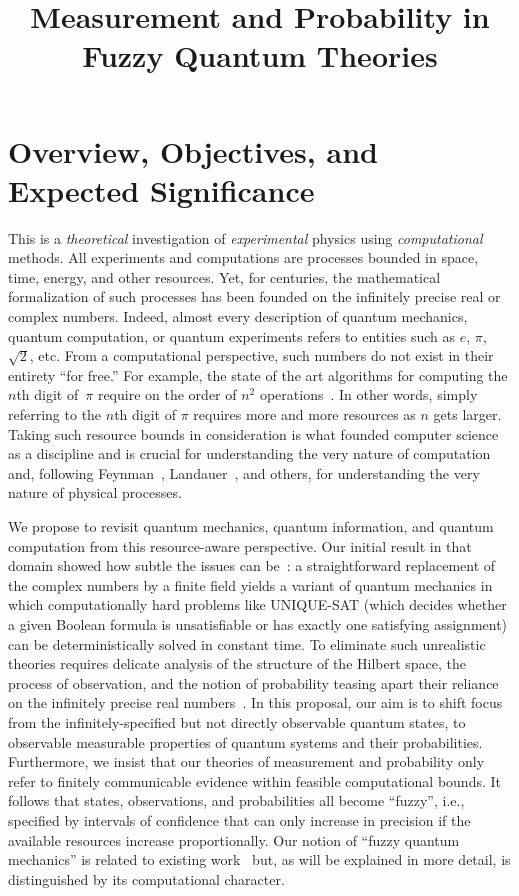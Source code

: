 \documentclass{article}
\title{Measurement and Probability in Fuzzy Quantum Theories}
\date{}
\theoremstyle{remark}
\begin{document}
\maketitle 

\section{Overview, Objectives, and Expected Significance} 

This is a \emph{theoretical} investigation of \emph{experimental}
physics using \emph{computational} methods. All experiments and
computations are processes bounded in space, time, energy, and other
resources. Yet, for centuries, the mathematical formalization of such
processes has been founded on the infinitely precise real or complex
numbers. Indeed, almost every description of quantum mechanics,
quantum computation, or quantum experiments refers to entities such as
$e$, $\pi$, $\sqrt{2}$, etc. From a computational perspective, such
numbers do not exist in their entirety ``for free.''  For example, the
state of the art algorithms for computing the $n$th digit of~$\pi$
require on the order of $n^2$
operations~\cite{journals/moc/BaileyBP97}. In other words, simply
referring to the $n$th digit of $\pi$ requires more and more resources
as $n$ gets larger. Taking such resource bounds in consideration is
what founded computer science as a discipline and is crucial for
understanding the very nature of computation and, following
Feynman~\cite{Feynman1982Simulating}, Landauer~\cite{Landauer1996188},
and others, for understanding the very nature of physical processes.

We propose to revisit quantum mechanics, quantum information, and
quantum computation from this resource-aware perspective. Our initial
result in that domain showed how subtle the issues can be~\cite{usat}:
a straightforward replacement of the complex numbers by a finite field
yields a variant of quantum mechanics in which computationally hard
problems like UNIQUE-SAT (which decides whether a given Boolean
formula is unsatisfiable or has exactly one satisfying assignment) can
be deterministically solved in constant time. To eliminate such
unrealistic theories requires delicate analysis of the structure of
the Hilbert space, the process of observation, and the notion of
probability teasing apart their reliance on the infinitely precise
real numbers~\cite{geometry2013,DQT2014}. In this proposal, our aim is
to shift focus from the infinitely-specified but not directly
observable quantum states, to observable measurable properties of
quantum systems and their probabilities. Furthermore, we insist that
our theories of measurement and probability only refer to finitely
communicable evidence within feasible computational bounds. It follows
that states, observations, and probabilities all become ``fuzzy'',
i.e., specified by intervals of confidence that can only increase in
precision if the available resources increase proportionally. Our
notion of ``fuzzy quantum mechanics'' is related to existing
work~\cite{GranikCaulfield1996,Pykacz2013,SNL2009,Gudder2005,aerts1993physical}
but, as will be explained in more detail, is distinguished by its
computational character.
\end{document}
